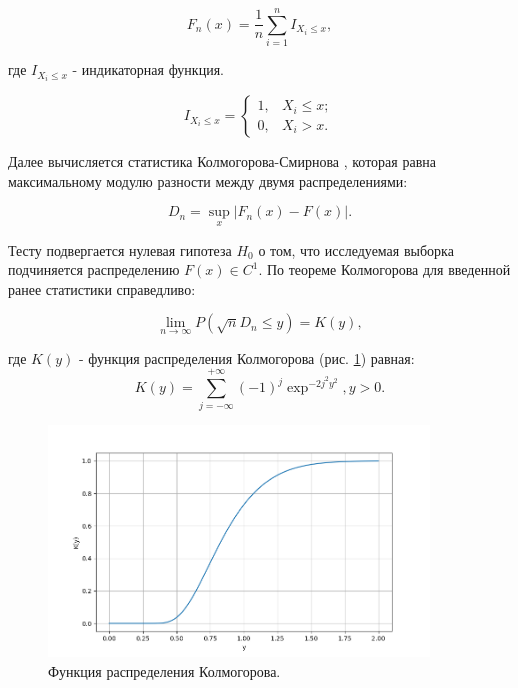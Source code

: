 ﻿\documentclass[a4paper,14pt]{extarticle}
\begin{document}
    \begin{equation}
      F_n(x) = \frac{1}{n} \sum_{i=1}^n I_{X_i \leq x},
    \end{equation}
    
    \noindent где $I_{X_i \leq x}$ - индикаторная функция.
    
    \begin{equation}
      I_{X_i \leq x} = 
      \begin{cases}
        1, & X_i \leq x; \\
        0, & X_i > x.
      \end{cases}
    \end{equation}
    
    Далее вычисляется статистика Колмогорова-Смирнова \cite{kolmogorov} \cite{frank_j}, которая равна 
    максимальному модулю разности между двумя распределениями:
    
    \begin{equation}
      D_n = \sup_x |F_n(x) - F(x)|.
    \end{equation}
    
    Тесту подвергается нулевая гипотеза $H_0$ о том, что исследуемая выборка подчиняется распределению
    $F(x) \in C^1$. По теореме Колмогорова для введенной ранее статистики справедливо:
    
    \begin{equation}
      \lim_{n \rightarrow \infty} P(\sqrt{n}D_n \leq y) = K(y),
    \end{equation}
    
    \noindent где $K(y)$ - функция распределения Колмогорова (рис. \ref{fig:kolmogorov}) равная:
    \begin{equation}
      K(y) = \sum_{j=-\infty}^{+\infty} (-1)^j\exp^{-2j^2y^2}, y > 0.
    \end{equation}
    
    \begin{figure}
        \center
        \includegraphics[width=0.9\textwidth]{kolmogorov.png}
        \captionsetup{width=0.8\textwidth}
        \caption{Функция распределения Колмогорова.}
        \label{fig:kolmogorov}
    \end{figure}
    
\end{document}
